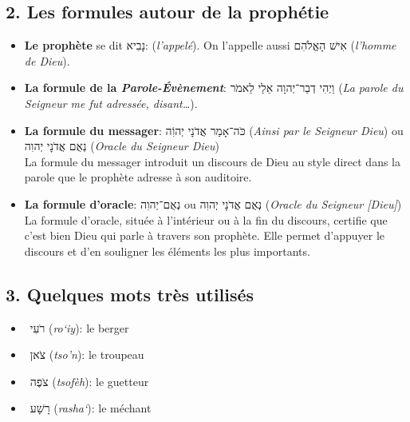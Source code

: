 \subsection*{2. Les formules autour de la prophétie}
\begin{itemize}[label=] 
\item \textbf{Le prophète} se dit \texthebrew{נָבִיא}: (\textit{l'appelé}). On l'appelle aussi \texthebrew{אִישׁ הָאֱלֹהִם} (\textit{l'homme de Dieu}).
\item \textbf{La formule de la \textit{Parole-Évènement}}: \texthebrew{וַיְהִי דְבַר־יְהוָה אֵלַי לֵאמֹר} (\textit{La parole du Seigneur me fut adressée, disant…}).
\item \textbf{La formule du messager}: \texthebrew{כֹּה־אָמַר אֲדֹנָי יְהוִֹה} (\textit{Ainsi par le Seigneur Dieu}) ou \texthebrew{נְאֻם אֲדֹנָי יְהוִה} (\textit{Oracle du Seigneur Dieu}) \\
La formule du messager introduit un discours de Dieu au style direct dans la parole que le prophète adresse à son auditoire.
\item \textbf{La formule d'oracle}: \texthebrew{נְאֻם־יְהוִה} ou \texthebrew{נְאֻם אֲדֹנָי יְהוִה} (\textit{Oracle du Seigneur [Dieu]})\\
La formule d'oracle, située à l'intérieur ou à la fin du discours, certifie que c'est bien Dieu qui parle à travers son prophète. Elle permet d'appuyer le discours et d'en souligner les éléments les plus importants.
\end{itemize}

\subsection*{3. Quelques mots très utilisés}
\begin{itemize}[label=] 
\item ~\texthebrew{רֹעִי} (\textit{ro‘iy}): le berger
\item ~\texthebrew{צֹאן} (\textit{tso'n}): le troupeau
\item ~\texthebrew{צֹפֶה} (\textit{tsofèh}): le guetteur
\item ~\texthebrew{רָשָׁע} (\textit{rasha‘}): le méchant
\end{itemize}